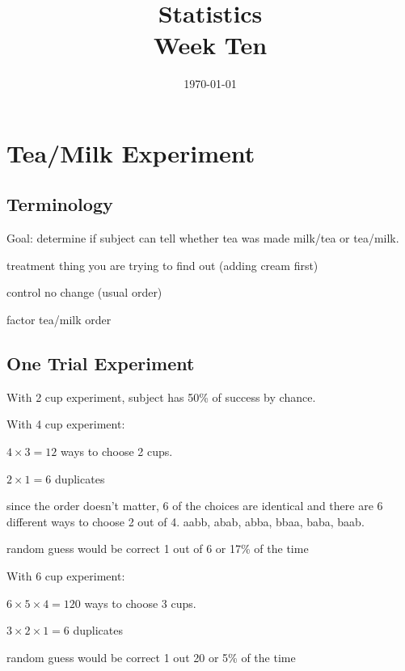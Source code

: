 \documentclass[landscape]{exam}
\title{Statistics \\ Week Ten}
\date{\today}
\author{}
\begin{document}
  \maketitle
  \tableofcontents

  \section{Tea/Milk Experiment}

  \subsection{Terminology}
  
  Goal: determine if subject can tell whether tea was made milk/tea or tea/milk.

  \begin{description*}
    \item[treatment] thing you are trying to find out (adding cream first)
    \item[control] no change (usual order)
    \item[factor] tea/milk order
  \end{description*}

  \subsection{One Trial Experiment}
  With 2 cup experiment, subject has 50\% of success by chance.

  With 4 cup experiment:
  \begin{itemize*}
    \item $4 \times 3 = 12$ ways to choose 2 cups.  
    \item $2 \times 1 = 6$ duplicates
    \item since the order doesn't matter, 6 of the choices are identical and
      there are 6 different ways to choose 2 out of 4. aabb, abab, abba, bbaa,
      baba, baab.
    \item random guess would be correct 1 out of 6 or 17\% of the time
  \end{itemize*}

  With 6 cup experiment:
  \begin{itemize*}
    \item $6 \times 5 \times 4 = 120$ ways to choose 3 cups.  
    \item $3 \times 2 \times 1 = 6$ duplicates
    \item random guess would be correct 1 out 20 or 5\% of the time
  \end{itemize*}
\end{document}
